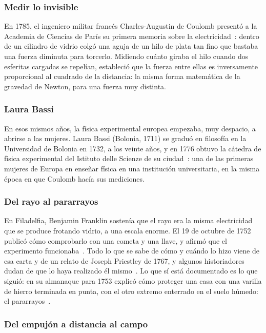 \documentclass[11pt]{article}
\begin{document}
\subsubsection*{Medir lo invisible}

En 1785, el ingeniero militar francés Charles-Augustin de Coulomb presentó a
la Academia de Ciencias de París su primera memoria sobre la
electricidad~\cite{coulomb1785}: dentro de un cilindro de vidrio colgó una
aguja de un hilo de plata tan fino que bastaba una fuerza diminuta para
torcerlo. Midiendo cuánto giraba el hilo cuando dos esferitas cargadas se
repelían, estableció que la fuerza entre ellas es inversamente proporcional al
cuadrado de la distancia: la misma forma matemática de la gravedad de Newton,
para una fuerza muy distinta.

\subsubsection*{Laura Bassi}

En esos mismos años, la física experimental europea empezaba, muy despacio, a
abrirse a las mujeres. Laura Bassi (Bolonia, 1711) se graduó en filosofía en
la Universidad de Bolonia en 1732, a los veinte años, y en 1776 obtuvo la
cátedra de física experimental del Istituto delle Scienze de su
ciudad~\cite{bassi}: una de las primeras mujeres de Europa en enseñar física
en una institución universitaria, en la misma época en que Coulomb hacía sus
mediciones.

\subsubsection*{Del rayo al pararrayos}

En Filadelfia, Benjamin Franklin sostenía que el rayo era la misma
electricidad que se produce frotando vidrio, a una escala enorme. El 19 de
octubre de 1752 publicó cómo comprobarlo con una cometa y una llave, y afirmó
que el experimento funcionaba~\cite{franklin1752}. Todo lo que se sabe de cómo
y cuándo lo hizo viene de esa carta y de un relato de Joseph Priestley de
1767, y algunos historiadores dudan de que lo haya realizado él
mismo~\cite{debatecometa}. Lo que sí está documentado es lo que siguió: en su
almanaque para 1753 explicó cómo proteger una casa con una varilla de hierro
terminada en punta, con el otro extremo enterrado en el suelo húmedo: el
pararrayos~\cite{franklin1753}.

\subsubsection*{Del empujón a distancia al campo}
\end{document}
